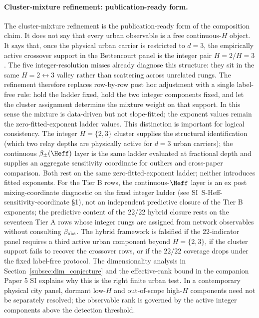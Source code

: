 \paragraph{Cluster-mixture refinement: publication-ready form.}
The cluster-mixture refinement is the publication-ready form of the
composition claim. It does not say that every urban observable is a free
continuous-\(H\) object. It says that, once the physical urban carrier is
restricted to \(d=3\), the empirically active crossover support in the
Bettencourt panel is the integer pair \(H=2/H=3\). The five integer-resolution
misses already diagnose this structure: they sit in the same
\(H=2\leftrightarrow3\) valley rather than scattering across unrelated
rungs. The refinement therefore replaces row-by-row post hoc adjustment with
a single label-free rule: hold the ladder fixed, hold the two integer
components fixed, and let the cluster assignment determine the mixture weight
on that support. In this sense the mixture is data-driven but not
slope-fitted; the exponent values remain the zero-fitted-exponent ladder values.
This distinction is important for logical consistency. The integer
\(H{=}\{2,3\}\) cluster supplies the structural identification (which two
relay depths are physically active for $d{=}3$ urban carriers); the
continuous \(\beta_{\pm}(\Heff)\) layer is the same ladder evaluated at
fractional depth and supplies an aggregate sensitivity coordinate for
outliers and cross-paper comparison. Both rest on the same zero-fitted-exponent
ladder; neither introduces fitted exponents. For the Tier B rows, the continuous-\(\Heff\) layer is an ex post mixing-coordinate diagnostic on the fixed integer ladder (see SI~\textsf{S-Heff-sensitivity-coordinate} \S 1), not an independent predictive closure of the Tier B exponents; the predictive content of the 22/22 hybrid closure rests on the seventeen Tier A rows whose integer rungs are assigned from network observables without consulting \(\beta_{\rm obs}\). The hybrid framework is
falsified if the 22-indicator panel requires a third active urban component
beyond \(H{=}\{2,3\}\), if the cluster support fails to recover the
crossover rows, or if the \(22/22\) coverage drops under the fixed
label-free protocol. The dimensionality analysis in
Section~\ref{subsec:dim_conjecture} and the effective-rank bound in
the companion Paper 5 SI explains why this is the right finite
urban test. In a contemporary physical city panel, dormant low-\(H\) and
out-of-scope high-\(H\) components need not be separately resolved; the
observable rank is governed by the active integer components above the
detection threshold.


